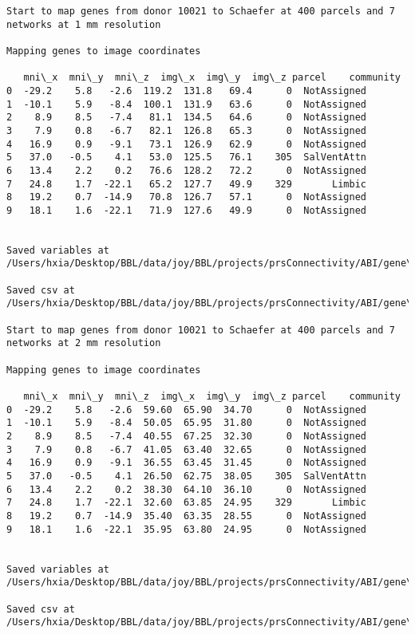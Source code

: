 \documentclass[11pt]{article}
\begin{document}
\begin{Verbatim}[commandchars=\\\{\}]
Start to map genes from donor 10021 to Schaefer at 400 parcels and 7 networks at 1 mm resolution

Mapping genes to image coordinates

   mni\_x  mni\_y  mni\_z  img\_x  img\_y  img\_z parcel    community
0  -29.2    5.8   -2.6  119.2  131.8   69.4      0  NotAssigned
1  -10.1    5.9   -8.4  100.1  131.9   63.6      0  NotAssigned
2    8.9    8.5   -7.4   81.1  134.5   64.6      0  NotAssigned
3    7.9    0.8   -6.7   82.1  126.8   65.3      0  NotAssigned
4   16.9    0.9   -9.1   73.1  126.9   62.9      0  NotAssigned
5   37.0   -0.5    4.1   53.0  125.5   76.1    305  SalVentAttn
6   13.4    2.2    0.2   76.6  128.2   72.2      0  NotAssigned
7   24.8    1.7  -22.1   65.2  127.7   49.9    329       Limbic
8   19.2    0.7  -14.9   70.8  126.7   57.1      0  NotAssigned
9   18.1    1.6  -22.1   71.9  127.6   49.9      0  NotAssigned


Saved variables at /Users/hxia/Desktop/BBL/data/joy/BBL/projects/prsConnectivity/ABI/gene\_mapping/10021donor\_400Parcels\_7Network\_1mm.pkl

Saved csv at /Users/hxia/Desktop/BBL/data/joy/BBL/projects/prsConnectivity/ABI/gene\_mapping/10021donor\_400Parcels\_7Network\_1mm.csv

Start to map genes from donor 10021 to Schaefer at 400 parcels and 7 networks at 2 mm resolution

Mapping genes to image coordinates

   mni\_x  mni\_y  mni\_z  img\_x  img\_y  img\_z parcel    community
0  -29.2    5.8   -2.6  59.60  65.90  34.70      0  NotAssigned
1  -10.1    5.9   -8.4  50.05  65.95  31.80      0  NotAssigned
2    8.9    8.5   -7.4  40.55  67.25  32.30      0  NotAssigned
3    7.9    0.8   -6.7  41.05  63.40  32.65      0  NotAssigned
4   16.9    0.9   -9.1  36.55  63.45  31.45      0  NotAssigned
5   37.0   -0.5    4.1  26.50  62.75  38.05    305  SalVentAttn
6   13.4    2.2    0.2  38.30  64.10  36.10      0  NotAssigned
7   24.8    1.7  -22.1  32.60  63.85  24.95    329       Limbic
8   19.2    0.7  -14.9  35.40  63.35  28.55      0  NotAssigned
9   18.1    1.6  -22.1  35.95  63.80  24.95      0  NotAssigned


Saved variables at /Users/hxia/Desktop/BBL/data/joy/BBL/projects/prsConnectivity/ABI/gene\_mapping/10021donor\_400Parcels\_7Network\_2mm.pkl

Saved csv at /Users/hxia/Desktop/BBL/data/joy/BBL/projects/prsConnectivity/ABI/gene\_mapping/10021donor\_400Parcels\_7Network\_2mm.csv


\end{Verbatim}
\end{document}
